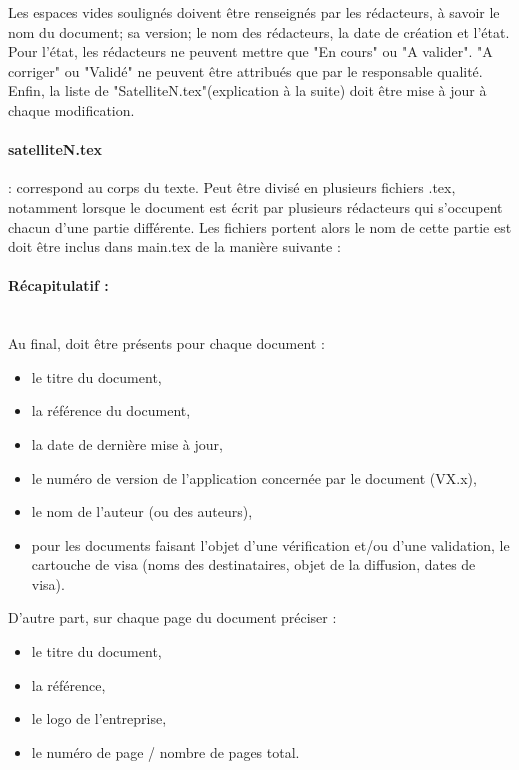 \par Les espaces vides soulignés doivent être renseignés par les rédacteurs, à savoir le nom du document; sa version; le nom des rédacteurs,
la date de création et l'état. Pour l'état, les rédacteurs ne peuvent mettre que "En cours" ou "A valider". "A corriger" ou "Validé" ne peuvent
être attribués que par le responsable qualité. Enfin, la liste de "SatelliteN.tex"(explication à la suite) doit être mise à jour à chaque modification.\\
          \paragraph{satelliteN.tex} : correspond au corps du texte. Peut être divisé en plusieurs fichiers .tex, notamment lorsque le document
                est écrit par plusieurs rédacteurs qui s'occupent chacun d'une partie différente. Les fichiers portent alors le nom de cette partie
                est doit être inclus dans main.tex de la manière suivante :
\begin{center}\begin{boxedverbatim}

\end{boxedverbatim} 
\end{center}
           
       
      
      \paragraph{Récapitulatif :\\~\\}  
       Au final, doit être présents pour chaque document :
      \begin{itemize}
        \item le titre du document,
        \item la référence du document,
        \item la date de dernière mise à jour,
        \item le numéro de version de l'application concernée par le document (VX.x),
        \item le nom de l’auteur (ou des auteurs),
        \item pour les documents faisant l'objet d'une vérification et/ou d'une validation, le cartouche de visa (noms des destinataires, objet de la diffusion, dates de visa).\\
      \end{itemize}                                                                                                        
      D’autre part, sur chaque page du document préciser : \\
      \begin{itemize}
        \item le titre du document,
        \item la référence,
        \item le logo de l'entreprise,
        \item le numéro de page / nombre de pages total.
      \end{itemize}         
      
